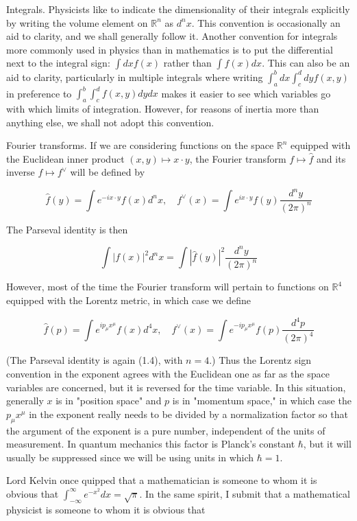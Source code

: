 \documentclass[10pt, letterpaper]{article}
\begin{document}
Integrals. Physicists like to indicate the dimensionality of their integrals explicitly by writing the volume element on $\mathbb{R}^{n}$ as $d^{n} x$. This convention is occasionally an aid to clarity, and we shall generally follow it. Another convention for integrals more commonly used in physics than in mathematics is to put the differential next to the integral sign: $\int d x f(x)$ rather than $\int f(x) d x$. This can also be an aid to clarity, particularly in multiple integrals where writing $\int_{a}^{b} d x \int_{c}^{d} d y f(x, y)$ in preference to $\int_{a}^{b} \int_{c}^{d} f(x, y) d y d x$ makes it easier to see which variables go with which limits of integration. However, for reasons of inertia more than anything else, we shall not adopt this convention.

Fourier transforms. If we are considering functions on the space $\mathbb{R}^{n}$ equipped with the Euclidean inner product $(x, y) \mapsto x \cdot y$, the Fourier transform $f \mapsto \widehat{f}$ and its inverse $f \mapsto f^{\vee}$ will be defined by

$$
\widehat{f}(y)=\int e^{-i x \cdot y} f(x) d^{n} x, \quad f^{\vee}(x)=\int e^{i x \cdot y} f(y) \frac{d^{n} y}{(2 \pi)^{n}}
$$

The Parseval identity is then

$$
\int|f(x)|^{2} d^{n} x=\int|\widehat{f}(y)|^{2} \frac{d^{n} y}{(2 \pi)^{n}}
$$

However, most of the time the Fourier transform will pertain to functions on $\mathbb{R}^{4}$ equipped with the Lorentz metric, in which case we define

$$
\widehat{f}(p)=\int e^{i p_{\mu} x^{\mu}} f(x) d^{4} x, \quad f^{\vee}(x)=\int e^{-i p_{\mu} x^{\mu}} f(p) \frac{d^{4} p}{(2 \pi)^{4}}
$$

(The Parseval identity is again (1.4), with $n=4$.) Thus the Lorentz sign convention in the exponent agrees with the Euclidean one as far as the space variables are concerned, but it is reversed for the time variable. In this situation, generally $x$ is in "position space" and $p$ is in "momentum space," in which case the $p_{\mu} x^{\mu}$ in the exponent really needs to be divided by a normalization factor so that the argument of the exponent is a pure number, independent of the units of measurement. In quantum mechanics this factor is Planck's constant $\hbar$, but it will usually be suppressed since we will be using units in which $\hbar=1$.

Lord Kelvin once quipped that a mathematician is someone to whom it is obvious that $\int_{-\infty}^{\infty} e^{-x^{2}} d x=\sqrt{\pi}$. In the same spirit, I submit that a mathematical physicist is someone to whom it is obvious that
\end{document}

